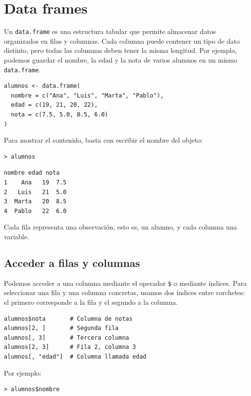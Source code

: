 \documentclass[11pt,a4paper]{article}
\theoremstyle{exercise}
\begin{document}
\section{Data frames}

Un \texttt{data.frame} es una estructura tabular que permite almacenar datos organizados en filas y columnas. Cada columna puede contener un tipo de dato distinto, pero todas las columnas deben tener la misma longitud. Por ejemplo, podemos guardar el nombre, la edad y la nota de varios alumnos en un mismo \texttt{data.frame}.

\begin{lstlisting}[style=rstyle]
alumnos <- data.frame(
  nombre = c("Ana", "Luis", "Marta", "Pablo"),
  edad = c(19, 21, 20, 22),
  nota = c(7.5, 5.0, 8.5, 6.0)
)
\end{lstlisting}

Para mostrar el contenido, basta con escribir el nombre del objeto:

\begin{lstlisting}[style=rconsole]
> alumnos
\end{lstlisting}

\begin{lstlisting}[style=routput]
  nombre edad nota
1    Ana   19  7.5
2   Luis   21  5.0
3  Marta   20  8.5
4  Pablo   22  6.0
\end{lstlisting}

Cada fila representa una observación, esto es, un alumno, y cada columna una variable.

\subsection{Acceder a filas y columnas}

Podemos acceder a una columna mediante el operador \texttt{\$} o mediante índices. Para seleccionar una fila y una columna concretas, usamos dos índices entre corchetes: el primero corresponde a la fila y el segundo a la columna.

\begin{lstlisting}[style=rstyle]
alumnos$nota       # Columna de notas
alumnos[2, ]       # Segunda fila
alumnos[, 3]       # Tercera columna
alumnos[2, 3]      # Fila 2, columna 3
alumnos[, "edad"]  # Columna llamada edad
\end{lstlisting}

\noindent Por ejemplo:

\begin{lstlisting}[style=rconsole]
> alumnos$nombre
\end{lstlisting}
\end{document}
